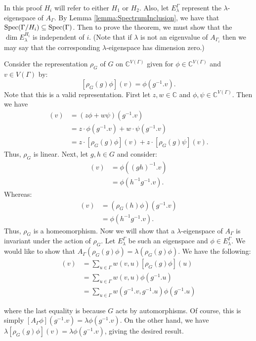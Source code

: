 In this proof $H_i$ will refer to either $H_1$ or $H_2$. Also, let $E_\lambda^{\Gamma}$ represent the $\lambda$-eigenspace of $A_\Gamma$. By Lemma \ref{lemma:SpectrumInclusion}, we have that $ \operatorname*{Spec}(\Gamma / H_i) \subseteq \operatorname*{Spec}(\Gamma) $. Then to prove the theorem, we must show that the $\operatorname{dim} E_\lambda^{H_i}$ is independent of $i$. (Note that if $\lambda$ is not an eigenvalue of $A_{\Gamma_i}$ then we may say that the corresponding $\lambda$-eigenspace has dimension zero.)

Consider the representation $\rho_G$ of $G$ on $\mathbb{C}^{V(\Gamma)}$ given for $\phi \in \mathbb{C}^{V(\Gamma)}$ and $v \in V(\Gamma)$ by:
$$
[\rho_G(g)\phi](v) = \phi(g^{-1}.v).
$$
Note that this is a valid representation. First let $z,w \in \mathbb{C}$ and $\phi, \psi \in \mathbb{C}^{V(\Gamma)}$. Then we have
\begin{align*}
    [ \rho_G(g)(z \phi + w \psi) ](v) &= (z \phi + w \psi)(g^{-1}.v) \\
    &= z \cdot \phi(g^{-1}.v) + w \cdot \psi(g^{-1}.v) \\
    &= z \cdot [ \rho_G(g)\phi ](v) + z \cdot [ \rho_G(g)\psi ](v).
\end{align*}
Thus, $\rho_G$ is linear. Next, let $g, h \in G$ and consider:
\begin{align*}
    [ \rho_G(gh)\phi ](v) &= \phi((gh)^{-1}.v) \\
    &= \phi(h^{-1}g^{-1}.v).
\end{align*}
Whereas:
\begin{align*}
    [ (\rho_G(g) \circ \rho_G(h))\phi ](v) &= (\rho_G(h)\phi)(g^{-1}.v) \\
    &= \phi(h^{-1}g^{-1}.v).
\end{align*}
Thus, $\rho_G$ is a homeomorphism. Now we will show that a $\lambda$-eigenspace of $A_\Gamma$ is invariant under the action of $\rho_G$. Let $E_{\lambda}^{\Gamma}$ be such an eigenspace and $\phi \in E_{\lambda}^{\Gamma}$. We would like to show that $A_\Gamma (\rho_G(g)\phi) = \lambda (\rho_G(g)\phi)$. We have the following:
\begin{align*}
[A_\Gamma (\rho_G(g)\phi)](v) &= \sum_{u \in \Gamma} w(v, u)[ \rho_G(g)\phi ](u) \\
&= \sum_{u \in \Gamma} w(v, u)\phi(g^{-1}.u) \\
&= \sum_{u \in \Gamma} w(g^{-1}.v, g^{-1}.u)\phi(g^{-1}.u)
\end{align*}

where the last equality is because $G$ acts by automorphisms. Of course, this is simply $[A_\Gamma \phi](g^{-1}.v) = \lambda \phi(g^{-1}.v)$. On the other hand, we have $\lambda [\rho_G(g)\phi](v) = \lambda \phi(g^{-1}.v)$, giving the desired result.

